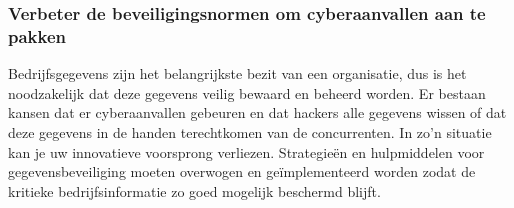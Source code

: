 
\subsubsection{Verbeter de beveiligingsnormen om cyberaanvallen aan te pakken}
Bedrijfsgegevens zijn het belangrijkste bezit van een organisatie, dus is het noodzakelijk dat deze gegevens veilig bewaard en beheerd worden. Er bestaan kansen dat er cyberaanvallen gebeuren en dat hackers alle gegevens wissen of dat deze gegevens in de handen terechtkomen van de concurrenten. In zo’n situatie kan je uw innovatieve voorsprong verliezen. Strategieën en hulpmiddelen voor gegevensbeveiliging moeten overwogen en geïmplementeerd worden zodat de kritieke bedrijfsinformatie zo goed mogelijk beschermd blijft. 

